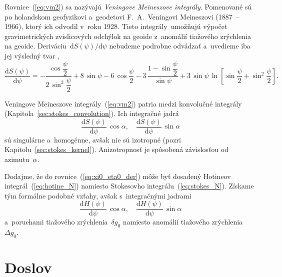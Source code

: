 \documentclass[a4paper, 12pt]{book}
\newcommand{\diff}{\mathrm d}
\begin{document}
Rovnice~(\ref{eq:vm2}) sa nazývajú \emph{Veningove Meineszove integrály}.  
Pomenované sú po holandskom geofyzikovi a~geodetovi F.~A.~Veningovi Meineszovi 
(1887~-- 1966), ktorý ich odvodil v~roku 1928.  Tieto integrály~umožňujú 
výpočet gravimetrických zvislicových odchýlok na geoide z~anomálií tiažového 
zrýchlenia na geoide.  Deriváciu~$\diff S(\psi) \slash \diff\psi$ nebudeme 
podrobne odvádzať a~uvedieme iba jej výsledný tvar
\parencite{MoritzPhysicalGeodesy},
%
\begin{equation}
\frac{\diff S(\psi)}{\diff \psi} = - \frac{\cos\dfrac{\psi}{2}}{2 \, 
\sin^2\dfrac{\psi}{2}} + 8 \, \sin\psi - 6 \, \cos\dfrac{\psi}{2} - 3\, \frac{1 
- \sin\dfrac{\psi}{2}}{\sin\psi} + 3 \, \sin\psi \, \ln \left[ 
\sin\dfrac{\psi}{2} + \sin^2\dfrac{\psi}{2} \right]{.}
\end{equation}

Veningove Meineszove integrály~(\ref{eq:vm2}) patria medzi konvolučné integrály 
(Kapitola~\ref{sec:stokes_convolution}).  Ich integračné jadrá
%
\begin{equation}
\label{eq:vm_kernels}
\frac{\diff S(\psi)}{\diff\psi} \, \cos\alpha{,} \quad \frac{\diff 
S(\psi)}{\diff\psi} \, \sin\alpha
\end{equation}
%
sú singulárne a~homogénne, avšak nie sú izotropné (pozri 
Kapitolu~\ref{sec:stokes_kernel}).  Anizotropnosť je spôsobená závislosťou od 
azimutu~$\alpha$.

Dodajme, že do rovnice~(\ref{eq:xi0_eta0_der}) môže byť dosadený Hotineov 
integrál~(\ref{eq:hotine_N}) namiesto Stokesovho integrálu~(\ref{eq:stokes_N}).  
Získame tým formálne podobné vzťahy, avšak s~integračnými jadrami
%
\begin{equation}
\label{eq:vm_kernels2}
\frac{\diff H(\psi)}{\diff\psi} \, \cos\alpha{,} \quad \frac{\diff 
H(\psi)}{\diff\psi} \, \sin\alpha
\end{equation}
%
a~poruchami tiažového zrýchlenia~$\delta g_0$ namiesto anomálií tiažového 
zrýchlenia~$\Delta g_0$.






\chapter*{Doslov}
\end{document}
